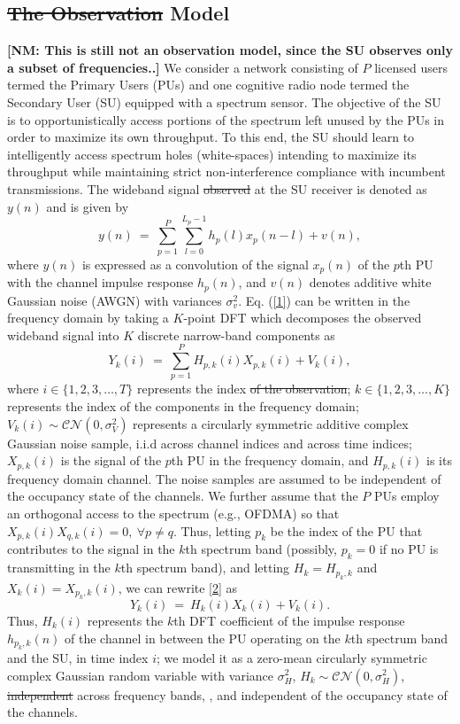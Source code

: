 \documentclass[10pt,twocolumn]{IEEEtran}
\newcommand{\sst}[1]{\st{#1}}
\newcommand{\nm}[1]{{\color{blue}\bf{[NM: #1]}}}
\newcommand{\add}[1]{{\color{red}{#1}}}
\begin{document}
\subsection{\sst{The Observation}\add{Signal} Model}
\nm{This is still not an observation model, since the SU observes only a subset of frequencies..}
We consider a network consisting of $P$ licensed users termed the Primary Users (PUs) and one cognitive radio node termed the Secondary User (SU) equipped with a spectrum sensor. The objective of the SU is to opportunistically access portions of the spectrum left unused by the PUs in order to maximize its own throughput. To this end, the SU should learn \add{how} to intelligently access spectrum holes (white-spaces) intending to maximize its throughput while maintaining strict non-interference compliance with incumbent transmissions.
 The wideband signal \sst{observed}\add{received} at the SU receiver \add{at time $n$} is denoted as $y(n)$ and is given by
\begin{equation}\label{1}
    y(n)\ =\ \sum_{p=1}^{P}\sum_{l=0}^{L_{p}-1} h_{p}(l)x_{p}(n-l) + v(n),
\end{equation}
where $y(n)$ is expressed as a convolution of the signal $x_{p}(n)$ of the $p$th PU with the channel impulse response $h_{p}(n)$, and $v(n)$ denotes additive white Gaussian noise (AWGN) with variances $\sigma_v^2$. Eq. (\ref{1}) can be written in the frequency domain by taking a $K$-point DFT which decomposes the observed wideband signal into $K$ discrete narrow-band components as
\begin{equation}\label{2}
    Y_k(i)\ =\ \sum_{p=1}^{P}H_{p,k}(i)X_{p,k}(i)+V_k(i),
\end{equation}
where $i \in \{1,2,3,\dots,T\}$ represents the \add{time} index\sst{ of the observation}; $k \in \{1,2,3,\dots,K\}$ represents the index of the components in the frequency domain; $V_k(i) \sim \mathcal{CN}(0,\sigma_V^2)$ represents a circularly symmetric additive complex Gaussian noise sample, i.i.d across channel indices and across time indices; $X_{p,k}(i)$ is the signal of the $p$th PU in the frequency domain, and $H_{p,k}(i)$ is its frequency domain channel. The noise samples are assumed to be independent of the occupancy state of the channels. We further assume that the $P$ PUs employ an orthogonal access to the spectrum (e.g., OFDMA) so that $X_{p,k}(i)X_{q,k}(i)=0,\ \forall p\neq q$. Thus, letting $p_k$ be the index of the PU that contributes to the signal in the $k$th spectrum band (possibly, $p_k=0$ if no PU is transmitting in the $k$th spectrum band), and letting  $H_{k}=H_{p_k,k}$ and $X_{k}(i)=X_{p_k,k}(i)$, we can rewrite \eqref{2} as
\begin{equation}\label{3}
    Y_k(i)\ =\ H_{k}(i)X_{k}(i) + V_k(i).
\end{equation}
Thus, $H_k(i)$ represents the $k$th DFT coefficient of the impulse response $h_{p_k,k}(n)$ of the channel in between the PU operating on the $k$th spectrum band and the SU, in time index $i$; we model it as a zero-mean circularly symmetric complex Gaussian random variable with variance $\sigma_H^2$, $H_k \sim \mathcal{CN}(0,\sigma_H^2)$, \sst{independent}\add{i.i.d.} across frequency bands, \add{over time}, and independent of the occupancy state of the channels.
\end{document}
